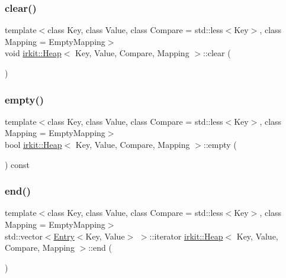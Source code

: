 \mbox{\label{classirkit_1_1Heap_a06373b7aa5262ffc4efe381042e8cb50}} 
\subsubsection{\texorpdfstring{clear()}{clear()}}
{\footnotesize\ttfamily template$<$class Key, class Value, class Compare = std\+::less$<$\+Key$>$, class Mapping = Empty\+Mapping$>$ \\
void \mbox{\hyperlink{classirkit_1_1Heap}{irkit\+::\+Heap}}$<$ Key, Value, Compare, Mapping $>$\+::clear (\begin{DoxyParamCaption}{ }\end{DoxyParamCaption})\hspace{0.3cm}{\ttfamily [inline]}}

\mbox{\label{classirkit_1_1Heap_abb96822afb46391c107efef35e79256b}} 
\subsubsection{\texorpdfstring{empty()}{empty()}}
{\footnotesize\ttfamily template$<$class Key, class Value, class Compare = std\+::less$<$\+Key$>$, class Mapping = Empty\+Mapping$>$ \\
bool \mbox{\hyperlink{classirkit_1_1Heap}{irkit\+::\+Heap}}$<$ Key, Value, Compare, Mapping $>$\+::empty (\begin{DoxyParamCaption}{ }\end{DoxyParamCaption}) const\hspace{0.3cm}{\ttfamily [inline]}}

\mbox{\label{classirkit_1_1Heap_a8451f5ab1ccb727e7964ce94e5ae3b6c}} 
\subsubsection{\texorpdfstring{end()}{end()}}
{\footnotesize\ttfamily template$<$class Key, class Value, class Compare = std\+::less$<$\+Key$>$, class Mapping = Empty\+Mapping$>$ \\
std\+::vector$<$\mbox{\hyperlink{structirkit_1_1Entry}{Entry}}$<$Key, Value$>$ $>$\+::iterator \mbox{\hyperlink{classirkit_1_1Heap}{irkit\+::\+Heap}}$<$ Key, Value, Compare, Mapping $>$\+::end (\begin{DoxyParamCaption}{ }\end{DoxyParamCaption})\hspace{0.3cm}{\ttfamily [inline]}}

